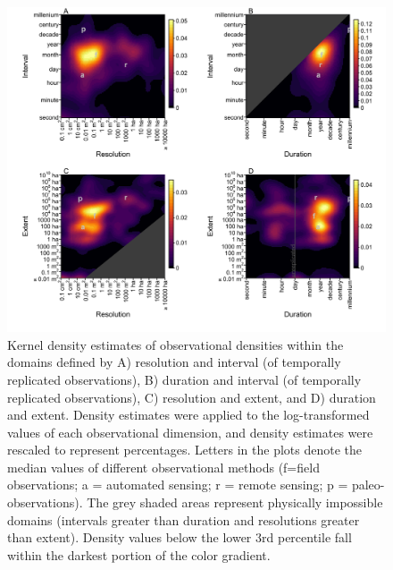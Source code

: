 \documentclass[12pt]{article}
\begin{document}
\begin{figure}[!ht]
\includegraphics[width=1\textwidth]{../vignettes/figures/fig2.png}
\vspace{-0.15 cm}
\caption{Kernel density estimates of observational densities within the domains defined by A) resolution and interval (of temporally replicated observations), B) duration and interval (of temporally replicated observations), C) resolution and extent, and D) duration and extent. Density estimates were applied to the log-transformed values of each observational dimension, and density estimates were rescaled to represent percentages. Letters in the plots denote the median values of different observational methods (f=field observations; a = automated sensing; r = remote sensing; p = paleo-observations). The grey shaded areas represent physically impossible domains (intervals greater than duration and resolutions greater than extent). Density values below the lower 3rd percentile fall within the darkest portion of the color gradient.}
\label{afoto1}
\end{figure}
\end{document}
